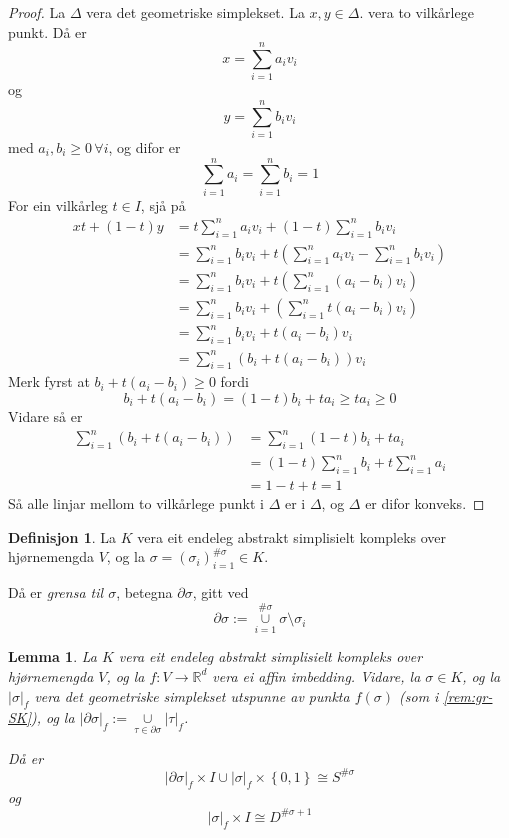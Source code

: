 \documentclass[a4paper, 12pt, norsk]{article}
\theoremstyle{plain}
\newtheorem{lemma}[theorem]{Lemma}
\theoremstyle{definition}
\newtheorem{definition}[theorem]{Definisjon}
\newcommand{\Rb}{\mathbb{R}}
\newcommand{\union}{ \mathop{\cup}\limits }
\newcommand{\gr}[1]{ \lvert #1 \rvert } %
\newcommand{\set}[1]{ \left\{ #1 \right\} } %
\newcommand{\tuple}[1]{ \left( #1 \right) } %
\begin{document}
\begin{proof}
	La \( \Delta \) vera det geometriske simplekset. La \( x, y \in \Delta \). vera to vilkårlege punkt. Då er
	\[
		x = \sum_{i=1}^n a_i v_i
	\]
	og
	\[
		y = \sum_{i=1}^n b_i v_i
	\]
	med \( a_i, b_i \geq 0 \, \forall i \), og difor er
	\[
		\sum_{i=1}^n a_i = \sum_{i=1}^n b_i = 1
	\]
	For ein vilkårleg \( t \in I \), sjå på
	\begin{align*}
		xt + (1-t)y &= t \sum_{i=1}^n a_i v_i + (1-t)\sum_{i=1}^n b_i v_i \\
		&= \sum_{i=1}^n b_i v_i +t\tuple{\sum_{i=1}^n a_i v_i-\sum_{i=1}^n b_i v_i} \\
		&= \sum_{i=1}^n b_i v_i +t\tuple{\sum_{i=1}^n (a_i-b_i) v_i} \\
		&= \sum_{i=1}^n b_i v_i +\tuple{\sum_{i=1}^n t(a_i-b_i) v_i} \\
		&= \sum_{i=1}^n b_i v_i +t(a_i-b_i) v_i \\
		&= \sum_{i=1}^n (b_i+t(a_i-b_i)) v_i
	\end{align*}
	Merk fyrst at \( b_i+t(a_i-b_i) \geq 0 \) fordi 
	\[ 
		b_i+t(a_i-b_i) = (1-t)b_i+ta_i \geq ta_i \geq 0
	\]
	Vidare så er
	\begin{align*}
		\sum_{i=1}^n (b_i+t(a_i-b_i)) &= \sum_{i=1}^n (1-t)b_i+ta_i \\
		&= (1-t)\sum_{i=1}^n b_i + t \sum_{i=1}^n a_i \\
		&= 1 - t + t = 1
	\end{align*}
	Så alle linjar mellom to vilkårlege punkt i \( \Delta \) er i \( \Delta \), og \( \Delta \) er difor konveks.
\end{proof}

\begin{definition}
	La \( K \) vera eit endeleg abstrakt simplisielt kompleks over hjørnemengda \( V \), og la \( \sigma = \tuple{\sigma_i}_{i=1}^{\#\sigma} \in K \). 
	
	Då er \emph{grensa til \( \sigma \)}, betegna \( \partial\sigma \), gitt ved
	\[
		\partial\sigma := \union_{i = 1}^{\#\sigma} \sigma \setminus \sigma_i 
	\]
\end{definition}

\begin{lemma} \label{thm:utvida-funk} %
	La \( K \) vera eit endeleg abstrakt simplisielt kompleks over hjørnemengda \( V \), og la \( f: V \to \Rb^d \) vera ei affin imbedding. Vidare, la \( \sigma \in K \), og la \( \gr{\sigma}_f \) vera det geometriske simplekset utspunne av punkta \( f(\sigma) \) (som i \autoref{rem:gr-SK}), og la \( \gr{\partial\sigma}_f := \union_{\tau \in \partial\sigma} \gr{\tau}_f \). 
	
	Då er
	\[
		\gr{\partial\sigma}_f \times I \union \gr{\sigma}_f \times \set{0, 1} \cong S^{\#\sigma}
	\]
	og
	\[
		\gr{\sigma}_f \times I \cong D^{\#\sigma+1}
	\] 
\end{lemma}
\end{document}
